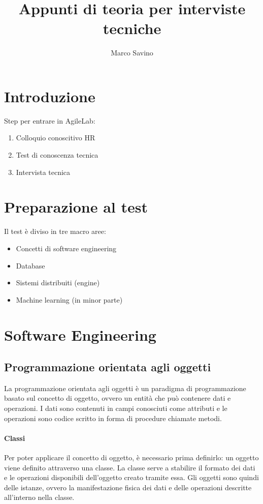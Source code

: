 \documentclass{article}
\title{Appunti di teoria per interviste tecniche}
\author{Marco Savino}
\date{}
\begin{document}
\maketitle

\section{Introduzione}
    Step per entrare in AgileLab:
    \begin{enumerate}
        \item Colloquio conoscitivo HR
        \item Test di conoscenza tecnica
        \item Intervista tecnica
    \end{enumerate}
    
\section{Preparazione al test}
    Il test è diviso in tre macro aree:
    \begin{itemize}
        \item Concetti di software engineering
        \item Database
        \item Sistemi distribuiti (engine)
        \item Machine learning (in minor parte)
    \end{itemize}

\section{Software Engineering}
    \subsection{Programmazione orientata agli oggetti}
        La programmazione orientata agli oggetti è un paradigma di programmazione basato sul concetto di oggetto, ovvero un entità che può contenere dati e operazioni. I dati sono contenuti in campi conosciuti come attributi e le operazioni sono codice scritto in forma di procedure chiamate metodi.
        \paragraph{Classi} Per poter applicare il concetto di oggetto, è necessario prima definirlo: un oggetto viene definito attraverso una classe. La classe serve a stabilire il formato dei dati e le operazioni disponibili dell'oggetto creato tramite essa. Gli oggetti sono quindi delle istanze, ovvero la manifestazione fisica dei dati e delle operazioni descritte all'interno nella classe.
        
\end{document}
